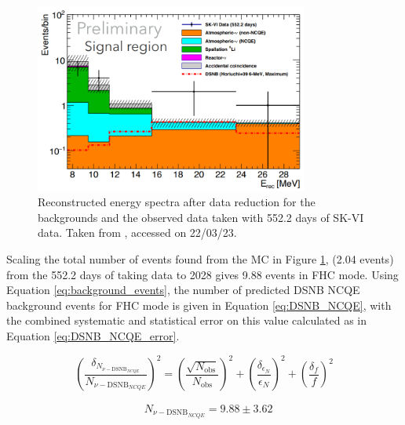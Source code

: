 \begin{figure}[!htb]
    \centering
    \includegraphics[width=0.8\textwidth]{Figures/DSNB_hist.png}
    \caption{Reconstructed energy spectra after data reduction for the backgrounds and the observed data taken with 552.2 days of SK-VI data. Taken from \cite{DSNBhist}, accessed on 22/03/23.}
    \label{fig:DSNB_hist}
\end{figure}

Scaling the total number of events found from the MC in Figure \ref{fig:DSNB_hist}, (2.04 events) from the 552.2 days of taking data to 2028 gives 9.88 events in FHC mode. Using Equation \ref{eq:background_events}, the number of predicted DSNB NCQE background events for FHC mode is given in Equation \ref{eq:DSNB_NCQE}, with the combined systematic and statistical error on this value calculated as in Equation \ref{eq:DSNB_NCQE_error}.

\begin{equation}
    \left(\frac{\delta_{N_{\nu-\mathrm{DSNB}_{NCQE}}}}{N_{\nu-\mathrm{DSNB}_{NCQE}}}\right)^{2} = \left({\frac{\sqrt{N_{\text{obs}}}}{N_{\text{obs}}}}\right)^{2} + \left({\frac{\delta_{\epsilon_{N}}}{\epsilon_{N}}}\right)^{2} + \left({\frac{\delta_{f}}{f}}\right)^{2}
\label{eq:DSNB_NCQE_error}
\end{equation}


\begin{equation}
    \begin{aligned}
        & N_{\nu-\mathrm{DSNB}_{NCQE}}= 9.88 \pm 3.62 \\
    \label{eq:DSNB_NCQE}
    \end{aligned}
\end{equation}


